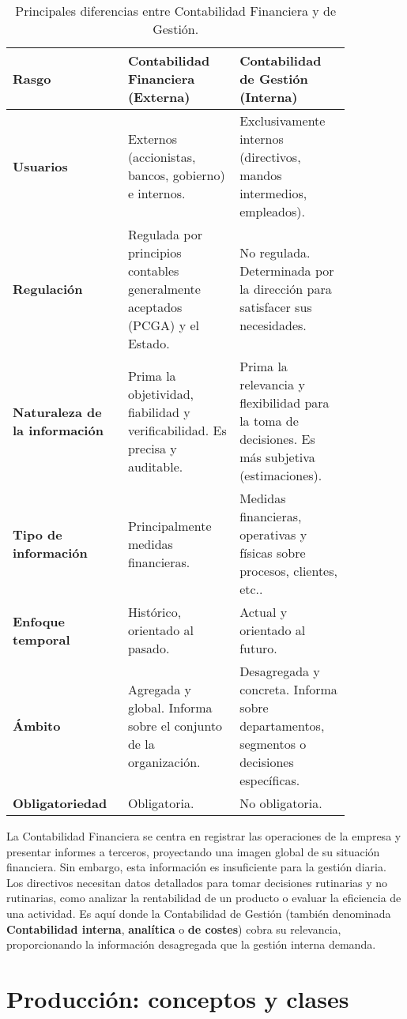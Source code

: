 \begin{table}[h!]
\centering
\caption{Principales diferencias entre Contabilidad Financiera y de Gestión.}
\begin{tabular}{p{0.25\linewidth} p{0.3\linewidth} p{0.3\linewidth}}
\hline
\textbf{Rasgo} & \textbf{Contabilidad Financiera (Externa)} & \textbf{Contabilidad de Gestión (Interna)} \\
\hline
\textbf{Usuarios} & Externos (accionistas, bancos, gobierno) e internos. & Exclusivamente internos (directivos, mandos intermedios, empleados). \\
\textbf{Regulación} & Regulada por principios contables generalmente aceptados (PCGA) y el Estado. & No regulada. Determinada por la dirección para satisfacer sus necesidades. \\
\textbf{Naturaleza de la información} & Prima la objetividad, fiabilidad y verificabilidad. Es precisa y auditable. & Prima la relevancia y flexibilidad para la toma de decisiones. Es más subjetiva (estimaciones). \\
\textbf{Tipo de información} & Principalmente medidas financieras. & Medidas financieras, operativas y físicas sobre procesos, clientes, etc.. \\
\textbf{Enfoque temporal} & Histórico, orientado al pasado. & Actual y orientado al futuro. \\
\textbf{Ámbito} & Agregada y global. Informa sobre el conjunto de la organización. & Desagregada y concreta. Informa sobre departamentos, segmentos o decisiones específicas. \\
\textbf{Obligatoriedad} & Obligatoria. & No obligatoria. \\
\hline
\end{tabular}
\end{table}

La Contabilidad Financiera se centra en registrar las operaciones de la empresa y presentar informes a terceros, proyectando una imagen global de su situación financiera. Sin embargo, esta información es insuficiente para la gestión diaria. Los directivos necesitan datos detallados para tomar decisiones rutinarias y no rutinarias, como analizar la rentabilidad de un producto o evaluar la eficiencia de una actividad. Es aquí donde la Contabilidad de Gestión (también denominada \textbf{Contabilidad interna}, \textbf{analítica} o \textbf{de costes}) cobra su relevancia, proporcionando la información desagregada que la gestión interna demanda.

\section{Producción: conceptos y clases}

